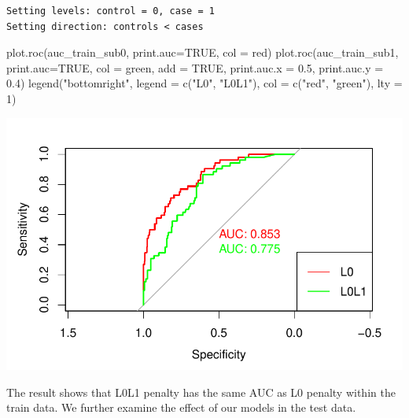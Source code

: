 \documentclass[
  letterpaper,
  DIV=11,
  numbers=noendperiod]{scrartcl}
\newenvironment{Shaded}{\begin{snugshade}}{\end{snugshade}}
\newcommand{\AttributeTok}[1]{\textcolor[rgb]{0.40,0.45,0.13}{#1}}
\newcommand{\ConstantTok}[1]{\textcolor[rgb]{0.56,0.35,0.01}{#1}}
\newcommand{\DecValTok}[1]{\textcolor[rgb]{0.68,0.00,0.00}{#1}}
\newcommand{\FloatTok}[1]{\textcolor[rgb]{0.68,0.00,0.00}{#1}}
\newcommand{\FunctionTok}[1]{\textcolor[rgb]{0.28,0.35,0.67}{#1}}
\newcommand{\NormalTok}[1]{\textcolor[rgb]{0.00,0.23,0.31}{#1}}
\newcommand{\StringTok}[1]{\textcolor[rgb]{0.13,0.47,0.30}{#1}}
\begin{document}
\begin{verbatim}
Setting levels: control = 0, case = 1
Setting direction: controls < cases
\end{verbatim}

\begin{Shaded}
\begin{Highlighting}[]
\FunctionTok{plot.roc}\NormalTok{(auc\_train\_sub0, }\AttributeTok{print.auc=}\ConstantTok{TRUE}\NormalTok{, }\AttributeTok{col =} \StringTok{\textquotesingle{}red\textquotesingle{}}\NormalTok{)}
\FunctionTok{plot.roc}\NormalTok{(auc\_train\_sub1, }\AttributeTok{print.auc=}\ConstantTok{TRUE}\NormalTok{, }\AttributeTok{col =} \StringTok{\textquotesingle{}green\textquotesingle{}}\NormalTok{, }\AttributeTok{add =} \ConstantTok{TRUE}\NormalTok{, }\AttributeTok{print.auc.x =} \FloatTok{0.5}\NormalTok{, }\AttributeTok{print.auc.y =} \FloatTok{0.4}\NormalTok{)}
\FunctionTok{legend}\NormalTok{(}\StringTok{"bottomright"}\NormalTok{, }\AttributeTok{legend =} \FunctionTok{c}\NormalTok{(}\StringTok{"L0"}\NormalTok{, }\StringTok{"L0L1"}\NormalTok{), }\AttributeTok{col =} \FunctionTok{c}\NormalTok{(}\StringTok{"red"}\NormalTok{, }\StringTok{"green"}\NormalTok{), }\AttributeTok{lty =} \DecValTok{1}\NormalTok{)}
\end{Highlighting}
\end{Shaded}

\includegraphics{Untitled_files/figure-pdf/unnamed-chunk-7-4.pdf}

The result shows that L0L1 penalty has the same AUC as L0 penalty within
the train data. We further examine the effect of our models in the test
data.
\end{document}

